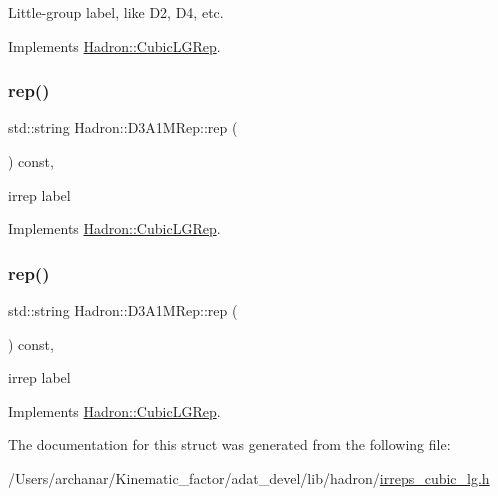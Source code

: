 Little-\/group label, like D2, D4, etc. 

Implements \mbox{\hyperlink{structHadron_1_1CubicLGRep_a9bdb14b519a611d21379ed96a3a9eb41}{Hadron\+::\+Cubic\+L\+G\+Rep}}.

\mbox{\label{structHadron_1_1D3A1MRep_ac976defff42a8379442ad25c629172c3}} 
\subsubsection{\texorpdfstring{rep()}{rep()}\hspace{0.1cm}{\footnotesize\ttfamily [1/2]}}
{\footnotesize\ttfamily std\+::string Hadron\+::\+D3\+A1\+M\+Rep\+::rep (\begin{DoxyParamCaption}{ }\end{DoxyParamCaption}) const\hspace{0.3cm}{\ttfamily [inline]}, {\ttfamily [virtual]}}

irrep label 

Implements \mbox{\hyperlink{structHadron_1_1CubicLGRep_a50f5ddbb8f4be4cee0106fa9e8c75e6c}{Hadron\+::\+Cubic\+L\+G\+Rep}}.

\mbox{\label{structHadron_1_1D3A1MRep_ac976defff42a8379442ad25c629172c3}} 
\subsubsection{\texorpdfstring{rep()}{rep()}\hspace{0.1cm}{\footnotesize\ttfamily [2/2]}}
{\footnotesize\ttfamily std\+::string Hadron\+::\+D3\+A1\+M\+Rep\+::rep (\begin{DoxyParamCaption}{ }\end{DoxyParamCaption}) const\hspace{0.3cm}{\ttfamily [inline]}, {\ttfamily [virtual]}}

irrep label 

Implements \mbox{\hyperlink{structHadron_1_1CubicLGRep_a50f5ddbb8f4be4cee0106fa9e8c75e6c}{Hadron\+::\+Cubic\+L\+G\+Rep}}.



The documentation for this struct was generated from the following file\+:\begin{DoxyCompactItemize}
\item 
/\+Users/archanar/\+Kinematic\+\_\+factor/adat\+\_\+devel/lib/hadron/\mbox{\hyperlink{lib_2hadron_2irreps__cubic__lg_8h}{irreps\+\_\+cubic\+\_\+lg.\+h}}\end{DoxyCompactItemize}
